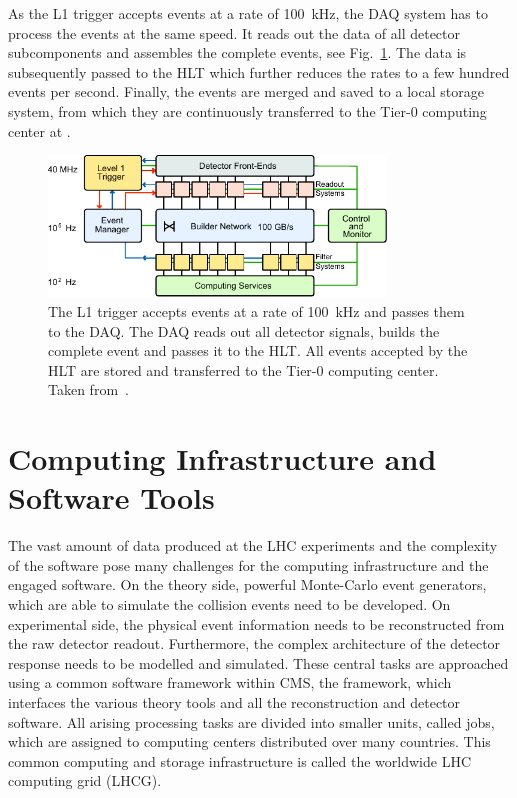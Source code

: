 As the L1 trigger accepts events at a rate of \SI{100}{\kilo\hertz}, the DAQ
system has to process the events at the same speed. It reads out the data of all
detector subcomponents and assembles the complete events, see
Fig.~\ref{fig:cms:daq_system}. The data is subsequently passed to the HLT  which
further reduces the rates to a few hundred events per second. Finally, the events are
merged and saved to a local storage system, from which they are continuously
transferred to the Tier-0 computing center at \CERN.

\begin{figure}[h!tp]
    \centering
    \includegraphics[width=0.8\textwidth]{figures/experimental_setup/cms_daq_new.pdf}\hfill
    \caption[The DAQ System of CMS]{The L1 trigger accepts events at a rate of
        \SI{100}{\kilo\hertz} and passes them to the DAQ. The DAQ reads out
        all detector signals, builds the complete event and passes it to the
        HLT. All events accepted by the HLT are stored and transferred to the
        Tier-0 computing center. Taken from~\cite{Bayatian:922757}.}
    \label{fig:cms:daq_system}
\end{figure}

\section{Computing Infrastructure and Software Tools}

The vast amount of data produced at the LHC experiments and the complexity of
the software pose many challenges for the computing infrastructure and the
engaged software. On the theory side, powerful Monte-Carlo event generators,
which are able to simulate the collision events need to be developed. On
experimental side, the physical event information needs to be reconstructed from
the raw detector readout. Furthermore, the complex architecture of the detector
response needs to be modelled and simulated. These central tasks are approached
using a common software framework within CMS, the \CMSSW framework, which
interfaces the various theory tools and all the reconstruction and detector
software. All arising processing tasks are divided into smaller units, called
jobs, which are assigned to computing centers distributed over many countries.
This common computing and storage infrastructure is called the worldwide LHC
computing grid (LHCG).

